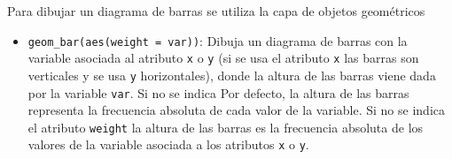 \documentclass[
  spanish,
  a4paper,
]{scrreport}
\providecommand{\tightlist}{%
  \setlength{\itemsep}{0pt}\setlength{\parskip}{0pt}}
\theoremstyle{definition}
\theoremstyle{definition}
\theoremstyle{remark}
\begin{document}
Para dibujar un diagrama de barras se utiliza la capa de objetos
geométricos

\begin{itemize}
\tightlist
\item
  \texttt{geom\_bar(aes(weight\ =\ var))}: Dibuja un diagrama de barras
  con la variable asociada al atributo \texttt{x} o \texttt{y} (si se
  usa el atributo \texttt{x} las barras son verticales y se usa
  \texttt{y} horizontales), donde la altura de las barras viene dada por
  la variable \texttt{var}. Si no se indica Por defecto, la altura de
  las barras representa la frecuencia absoluta de cada valor de la
  variable. Si no se indica el atributo \texttt{weight} la altura de las
  barras es la frecuencia absoluta de los valores de la variable
  asociada a los atributos \texttt{x} o \texttt{y}.
\end{itemize}
\end{document}
